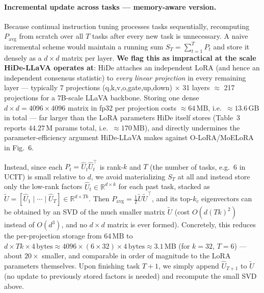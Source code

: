 \documentclass[a4paper]{article}
\begin{document}
\paragraph{Incremental update across tasks — memory-aware version.} Because continual instruction tuning processes tasks sequentially, recomputing $P_{\mathrm{avg}}$ from scratch over all $T$ tasks after every new task is unnecessary. A naive incremental scheme would maintain a running sum $S_T = \sum_{t=1}^T P_t$ and store it densely as a $d\times d$ matrix per layer. \textbf{We flag this as impractical at the scale HiDe-LLaVA operates at}: HiDe attaches an independent LoRA (and hence an independent consensus statistic) to \emph{every linear projection} in every remaining layer — typically 7 projections (q,k,v,o,gate,up,down) $\times$ 31 layers $\approx$ 217 projections for a 7B-scale LLaVA backbone. Storing one dense $d\times d = 4096\times 4096$ matrix in fp32 per projection costs $\approx 64\,\text{MB}$, i.e.\ $\approx 13.6\,\text{GB}$ in total — far larger than the LoRA parameters HiDe itself stores (Table~3 reports $44.27\,\text{M}$ params total, i.e.\ $\approx 170\,\text{MB}$), and directly undermines the parameter-efficiency argument HiDe-LLaVA makes against O-LoRA/MoELoRA in Fig.~6.

Instead, since each $P_t=\hat U_t\hat U_t^\top$ is rank-$k$ and $T$ (the number of tasks, e.g.\ 6 in UCIT) is small relative to $d$, we avoid materializing $S_T$ at all and instead store only the low-rank factors $\hat U_t\in\mathbb{R}^{d\times k}$ for each past task, stacked as $\tilde U = [\hat U_1 \mid \cdots \mid \hat U_T] \in \mathbb{R}^{d\times Tk}$. Then $P_{\mathrm{avg}} = \frac1T \tilde U\tilde U^\top$, and its top-$k_c$ eigenvectors can be obtained by an SVD of the much smaller matrix $\tilde U$ (cost $O(d(Tk)^2)$ instead of $O(d^3)$, and no $d\times d$ matrix is ever formed). Concretely, this reduces the per-projection storage from $64\,\text{MB}$ to $d\times Tk \times 4\,\text{bytes} \approx 4096\times(6\times32)\times4\,\text{bytes}\approx 3.1\,\text{MB}$ (for $k{=}32$, $T{=}6$) — about $20\times$ smaller, and comparable in order of magnitude to the LoRA parameters themselves. Upon finishing task $T{+}1$, we simply append $\hat U_{T+1}$ to $\tilde U$ (no update to previously stored factors is needed) and recompute the small SVD above.
\end{document}
